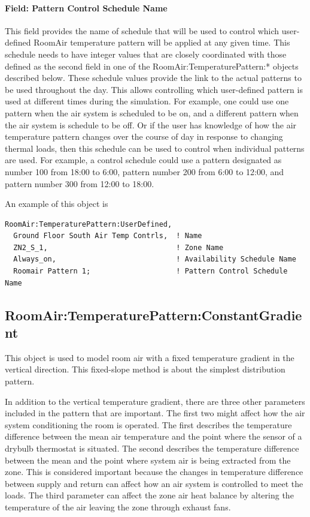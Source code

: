 \paragraph{Field: Pattern Control Schedule Name}\label{field-pattern-control-schedule-name}

This field provides the name of schedule that will be used to control which user-defined RoomAir temperature pattern will be applied at any given time. This schedule needs to have integer values that are closely coordinated with those defined as the second field in one of the RoomAir:TemperaturePattern:* objects described below. These schedule values provide the link to the actual patterns to be used throughout the day. This allows controlling which user-defined pattern is used at different times during the simulation. For example, one could use one pattern when the air system is scheduled to be on, and a different pattern when the air system is schedule to be off. Or if the user has knowledge of how the air temperature pattern changes over the course of day in response to changing thermal loads, then this schedule can be used to control when individual patterns are used. For example, a control schedule could use a pattern designated as number 100 from 18:00 to 6:00, pattern number 200 from 6:00 to 12:00, and pattern number 300 from 12:00 to 18:00.

An example of this object is

\begin{lstlisting}
RoomAir:TemperaturePattern:UserDefined,
  Ground Floor South Air Temp Contrls,  ! Name
  ZN2_S_1,                              ! Zone Name
  Always_on,                            ! Availability Schedule Name
  Roomair Pattern 1;                    ! Pattern Control Schedule Name
\end{lstlisting}

\subsection{RoomAir:TemperaturePattern:ConstantGradient}\label{roomairtemperaturepatternconstantgradient}

This object is used to model room air with a fixed temperature gradient in the vertical direction. This fixed-slope method is about the simplest distribution pattern.

In addition to the vertical temperature gradient, there are three other parameters included in the pattern that are important. The first two might affect how the air system conditioning the room is operated. The first describes the temperature difference between the mean air temperature and the point where the sensor of a drybulb thermostat is situated. The second describes the temperature difference between the mean and the point where system air is being extracted from the zone. This is considered important because the changes in temperature difference between supply and return can affect how an air system is controlled to meet the loads. The third parameter can affect the zone air heat balance by altering the temperature of the air leaving the zone through exhaust fans.

